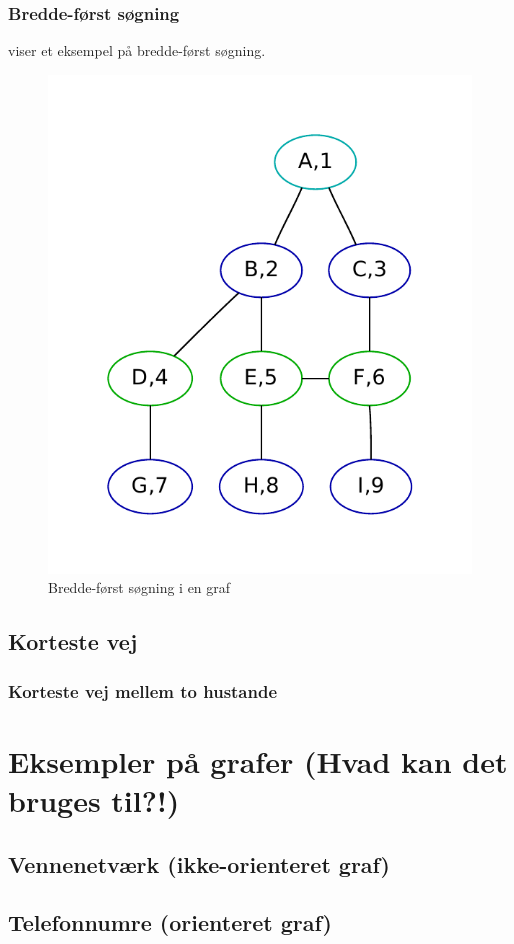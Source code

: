 \documentclass[10pt,a4paper,danish]{article}
\begin{document}
\subsubsection{Bredde-først søgning}
 viser et eksempel på bredde-først søgning.

\begin{figure}[h]\centering
\includegraphics[width=.6\textwidth]{graphs/breadth-first.pdf}
\caption{Bredde-først søgning i en graf}
\label{fig:breadth-first}
\end{figure}


\subsection{Korteste vej}
\label{sec:shortest_path}

\subsubsection{Korteste vej mellem to hustande}


\section{Eksempler på grafer (Hvad kan det bruges til?!)}
\subsection{Vennenetværk (ikke-orienteret graf)}
\subsection{Telefonnumre (orienteret graf)}
\end{document}
